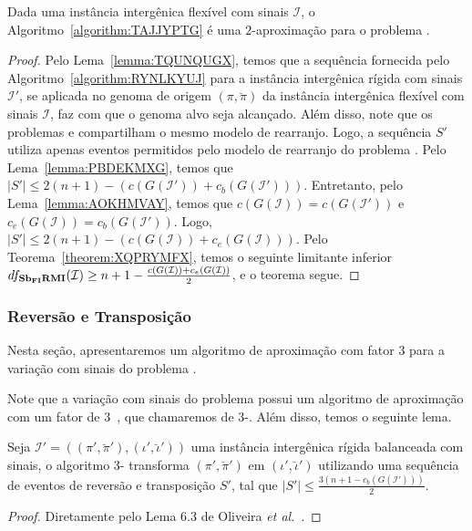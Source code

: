 

\begin{theorem}\label{theorem:PQWPQJDG}
Dada uma instância intergênica flexível com sinais $\mathcal{I}$, o Algoritmo~\ref{algorithm:TAJJYPTG} é uma $2$-aproximação para o problema \SbFIRMI{}.
\end{theorem}
\begin{proof}
Pelo Lema~\ref{lemma:TQUNQUGX}, temos que a sequência fornecida pelo Algoritmo~\ref{algorithm:RYNLKYUJ} para a instância intergênica rígida com sinais $\mathcal{I'}$, se aplicada no genoma de origem $(\pi,\breve\pi)$ da instância intergênica flexível com sinais $\mathcal{I}$, faz com que o genoma alvo seja alcançado. Além disso, note que os problemas \SbIRMI{} e \SbFIRMI{} compartilham o mesmo modelo de rearranjo. Logo, a sequência $S'$ utiliza apenas eventos permitidos pelo modelo de rearranjo do problema \SbFIRMI{}. Pelo Lema~\ref{lemma:PBDEKMXG}, temos que $|S'| \le 2(n + 1) - (c(G(\mathcal{I}')) + c_b(G(\mathcal{I}')))$. Entretanto, pelo Lema~\ref{lemma:AOKHMVAY}, temos que $c(G(\mathcal{I})) = c(G(\mathcal{I}'))$ e $c_e(G(\mathcal{I})) = c_b(G(\mathcal{I}'))$. Logo, $|S'| \le 2(n + 1) - (c(G(\mathcal{I})) + c_e(G(\mathcal{I})))$. Pelo Teorema~\ref{theorem:XQPRYMFX}, temos o seguinte limitante inferior $df_{\textbf{Sb\textsubscript{FI}RMI}}(\mathcal{I}) \ge {n+1} - \frac{c(G(\mathcal{I})) + c_e(G(\mathcal{I}))}{2}$, e o teorema segue.
\end{proof}

\subsubsection{Reversão e Transposição}

Nesta seção, apresentaremos um algoritmo de aproximação com fator $3$ para a variação com sinais do problema \SbFIRT{}. 

Note que a variação com sinais do problema \SbIRT{} possui um algoritmo de aproximação com um fator de $3$~\cite{2021a-oliveira-etal}, que chamaremos de $3$-\SbIRT{}. Além disso, temos o seguinte lema.

\begin{lemma}\label{lemma:MNQTVIRT}
Seja $\mathcal{I}' = ((\pi',\breve\pi'),(\iota',\breve\iota'))$ uma instância intergênica rígida balanceada com sinais, o algoritmo $3$-\SbIRT{} transforma $(\pi',\breve\pi')$ em $(\iota',\breve\iota')$ utilizando uma sequência de eventos de reversão e transposição $S'$, tal que $|S'| \le \frac{3({n+1} - c_b(G(\mathcal{I}')))}{2}$.
\end{lemma}
\begin{proof}
Diretamente pelo Lema 6.3 de Oliveira \textit{et al.}~\cite{2021a-oliveira-etal}.
\end{proof}

